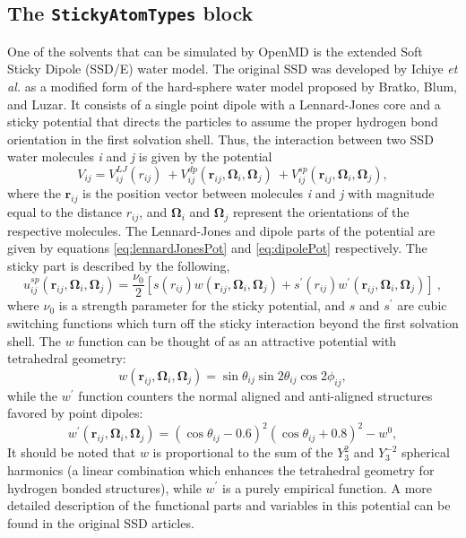 \documentclass[letterpaper]{report}
\begin{document}
\subsection{\label{section:ffSticky}The {\tt StickyAtomTypes} block}

One of the solvents that can be simulated by OpenMD is the
extended Soft Sticky Dipole (SSD/E) water model.\cite{fennell04} The
original SSD was developed by Ichiye \emph{et
  al.}\cite{liu96:new_model} as a modified form of the hard-sphere
water model proposed by Bratko, Blum, and
Luzar.\cite{Bratko85,Bratko95} It consists of a single point dipole
with a Lennard-Jones core and a sticky potential that directs the
particles to assume the proper hydrogen bond orientation in the first
solvation shell. Thus, the interaction between two SSD water molecules
\emph{i} and \emph{j} is given by the potential
\begin{equation}
V_{ij} = 
	V_{ij}^{LJ} (r_{ij})\ + V_{ij}^{dp}
	(\mathbf{r}_{ij},\mathbf{\Omega}_i,\mathbf{\Omega}_j)\ +
	V_{ij}^{sp}
	(\mathbf{r}_{ij},\mathbf{\Omega}_i,\mathbf{\Omega}_j),
\label{eq:ssdPot}
\end{equation}
where the $\mathbf{r}_{ij}$ is the position vector between molecules
\emph{i} and \emph{j} with magnitude equal to the distance $r_{ij}$, and
$\mathbf{\Omega}_i$ and $\mathbf{\Omega}_j$ represent the
orientations of the respective molecules. The Lennard-Jones and dipole
parts of the potential are given by equations \ref{eq:lennardJonesPot}
and \ref{eq:dipolePot} respectively. The sticky part is described by
the following,
\begin{equation}
u_{ij}^{sp}(\mathbf{r}_{ij},\mathbf{\Omega}_i,\mathbf{\Omega}_j)=
	\frac{\nu_0}{2}[s(r_{ij})w(\mathbf{r}_{ij},
	\mathbf{\Omega}_i,\mathbf{\Omega}_j) +
	s^\prime(r_{ij})w^\prime(\mathbf{r}_{ij},
	\mathbf{\Omega}_i,\mathbf{\Omega}_j)]\ ,
\label{eq:stickyPot}
\end{equation}
where $\nu_0$ is a strength parameter for the sticky potential, and
$s$ and $s^\prime$ are cubic switching functions which turn off the
sticky interaction beyond the first solvation shell. The $w$ function
can be thought of as an attractive potential with tetrahedral
geometry:
\begin{equation}
w(\mathbf{r}_{ij},\mathbf{\Omega}_i,\mathbf{\Omega}_j)=
	\sin\theta_{ij}\sin2\theta_{ij}\cos2\phi_{ij},
\label{eq:stickyW}
\end{equation}
while the $w^\prime$ function counters the normal aligned and
anti-aligned structures favored by point dipoles:
\begin{equation}
w^\prime(\mathbf{r}_{ij},\mathbf{\Omega}_i,\mathbf{\Omega}_j)=
	(\cos\theta_{ij}-0.6)^2(\cos\theta_{ij}+0.8)^2-w^0,
\label{eq:stickyWprime}
\end{equation}
It should be noted that $w$ is proportional to the sum of the $Y_3^2$
and $Y_3^{-2}$ spherical harmonics (a linear combination which
enhances the tetrahedral geometry for hydrogen bonded structures),
while $w^\prime$ is a purely empirical function.  A more detailed
description of the functional parts and variables in this potential
can be found in the original SSD
articles.\cite{liu96:new_model,liu96:monte_carlo,chandra99:ssd_md,Ichiye03}
\end{document}
